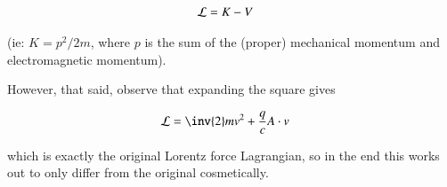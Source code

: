 \documentclass{article}
\begin{document}
\begin{align*}
\mathcal{L} &= K - V
\end{align*}

(ie: $K = p^2/2m$, where $p$ is the sum of the (proper) mechanical momentum and electromagnetic momentum).

However, that said, observe that expanding the square gives

\begin{align*}
\LL &= \inv{2} m v^2 + \frac{q}{c} A \cdot v 
\end{align*}

which is exactly the original Lorentz force Lagrangian, so in the end this works out to only differ from the original cosmetically.



\end{document}
